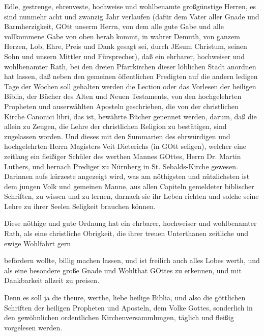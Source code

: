 Edle, gestrenge, ehrenveste, hochweise und wohlbenamte großgünstige Herren, es sind nunmehr acht und zwanzig Jahr verlaufen (dafür dem Vater aller Gnade und Barmherzigkeit, GOtt unserm Herrn, von dem alle gute Gabe und alle vollkommene Gabe von oben herab kommt, in wahrer Demuth, von ganzem Herzen, Lob, Ehre, Preis und Dank gesagt sei, durch JEsum Christum, seinen Sohn und unsern Mittler und Fürsprecher), daß ein ehrbarer, hochweiser und wohlbenamter Rath, bei den dreien Pfarrkirchen dieser löblichen Stadt anordnen hat lassen, daß neben den gemeinen öffentlichen Predigten auf die andern ledigen Tage der Wochen soll gehalten werden die Lection oder das Vorlesen der heiligen Biblia, der Bücher des Alten und Neuen Testaments, von den hochgelehrten Propheten und auserwählten Aposteln geschrieben, die von der christlichen Kirche Canonici libri, das ist, bewährte Bücher genennet werden, darum, daß die allein zu Zeugen, die Lehre der christlichen Religion zu bestätigen, sind zugelassen worden. Und dieses mit den Summarien des ehrwürdigen und hochgelehrten Herrn Magisters Veit Dieterichs (in GOtt seligen), welcher eine zeitlang ein fleißiger Schüler des werthen Mannes GOttes, Herrn Dr. Martin Luthers, und hernach Prediger zu Nürnberg in St. Sebalds-Kirche gewesen. Darinnen aufs kürzeste angezeigt wird, was am nöthigsten und nützlichsten ist dem jungen Volk und gemeinen Manne, aus allen Capiteln gemeldeter biblischer Schriften, zu wissen und zu lernen, darnach sie ihr Leben richten und solche seine Lehre zu ihrer Seelen Seligkeit brauchen können.

Diese nöthige und gute Ordnung hat ein ehrbarer, hochweiser und wohlbenamter Rath, als eine christliche Obrigkeit, die ihrer treuen Unterthanen zeitliche und ewige Wohlfahrt gern


befördern wollte, billig machen lassen, und ist freilich auch alles Lobes werth, und als eine besondere große Gnade und Wohlthat GOttes zu erkennen, und mit Dankbarkeit allzeit zu preisen.

Denn es soll ja die theure, werthe, liebe heilige Biblia, und also die göttlichen Schriften der heiligen Propheten und Aposteln, dem Volke Gottes, sonderlich in den gewöhnlichen ordentlichen Kirchenversammlungen, täglich und fleißig vorgelesen werden.


